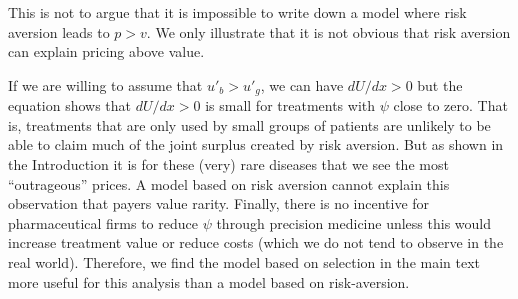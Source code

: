 \documentclass[a4paper,12pt]{article}
\begin{document}
This is not to argue that it is impossible to write down a model where risk aversion leads to \(p>v\). We only illustrate that it is not obvious that risk aversion can explain pricing above value.

If we are willing to assume that \(u'_b > u'_g\), we can have \(dU/dx >0\) but the equation shows that \(dU/dx > 0\) is small for treatments with \(\psi\) close to zero. That is, treatments that are only used by small groups of patients are unlikely to be able to claim much of the joint surplus created by risk aversion. But as shown in the Introduction it is for these (very) rare diseases that we see the most ``outrageous'' prices. A model based on risk aversion cannot explain this observation that payers value rarity. Finally, there is no incentive for pharmaceutical firms to reduce \(\psi\) through precision medicine unless this would increase treatment value or reduce costs (which we do not tend to observe in the real world). Therefore, we find the model based on selection in the main text more useful for this analysis than a model based on risk-aversion.
\end{document}
